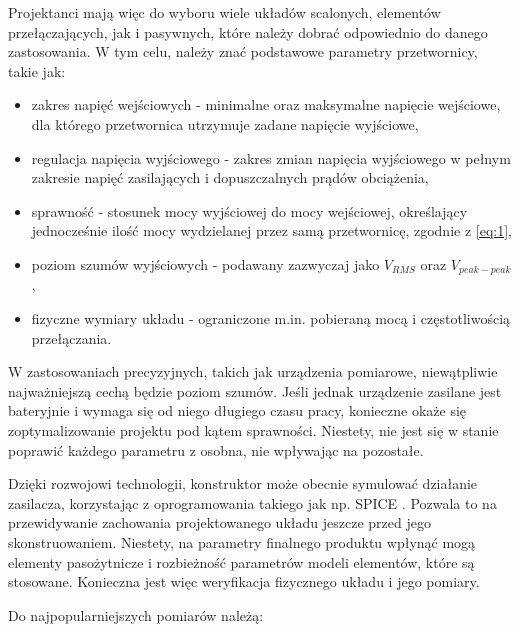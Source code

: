 Projektanci mają więc do wyboru wiele układów scalonych, elementów przełączających, jak i pasywnych, które należy dobrać odpowiednio do danego zastosowania.
W tym celu, należy znać podstawowe parametry przetwornicy, takie jak:

\begin{itemize}
    \item zakres napięć wejściowych - minimalne oraz maksymalne napięcie wejściowe, dla którego przetwornica utrzymuje zadane napięcie wyjściowe,
    \item regulacja napięcia wyjściowego - zakres zmian napięcia wyjściowego w pełnym zakresie napięć zasilających i dopuszczalnych prądów obciążenia,
    \item sprawność - stosunek mocy wyjściowej do mocy wejściowej, określający jednocześnie ilość mocy wydzielanej przez samą przetwornicę, zgodnie z \ref{eq:1},
    \item poziom szumów wyjściowych - podawany zazwyczaj jako $V_{RMS}$ oraz $V_{peak-peak}$,
    \item fizyczne wymiary układu - ograniczone m.in. pobieraną mocą i częstotliwością przełączania.
\end{itemize}

W zastosowaniach precyzyjnych, takich jak urządzenia pomiarowe, niewątpliwie 
najważniejszą cechą będzie poziom szumów. Jeśli jednak urządzenie zasilane jest 
bateryjnie i wymaga się od niego długiego czasu pracy, konieczne okaże się 
zoptymalizowanie projektu pod kątem sprawności. Niestety, nie jest się  w stanie 
poprawić każdego parametru z osobna, nie wpływając na pozostałe. 

Dzięki rozwojowi technologii, konstruktor może obecnie symulować działanie zasilacza, korzystając z 
oprogramowania takiego jak np. SPICE \cite{spice}. Pozwala to na przewidywanie zachowania 
projektowanego układu jeszcze przed jego skonstruowaniem. Niestety, na parametry 
finalnego produktu wpłynąć mogą elementy pasożytnicze i rozbieżność parametrów modeli 
elementów, które są stosowane. Konieczna jest więc weryfikacja fizycznego układu i jego
pomiary.

Do najpopularniejszych pomiarów należą:

